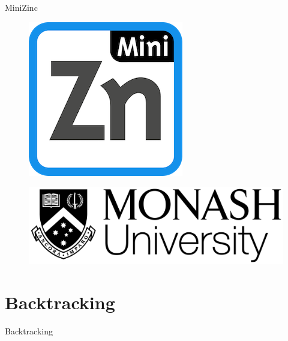 \documentclass[mathserif,table]{gkibeamer-aaai}
\begin{document}
\begin{frame}{MiniZinc}
	\begin{figure}[ht]
		\includegraphics[scale=0.2]{./figures/minizinc_logo.png}
	\end{figure}
	\begin{figure}[ht]
		\includegraphics[scale=0.1]{./figures/monash_logo.png}
	\end{figure}
\end{frame}

\begin{frame}
\end{frame}

\section{Backtracking}

\begin{frame}
	\begin{center}
		\huge{Backtracking}
	\end{center}
\end{frame}
\end{document}
